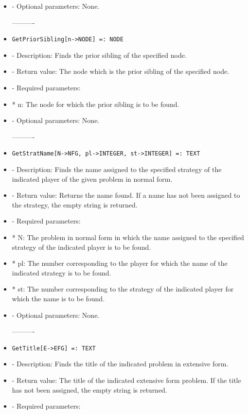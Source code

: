 \begin{itemize}
\item
- Optional parameters:  None.
\ed

----------
\item
\begin{verbatim}
GetPriorSibling[n->NODE] =: NODE
\end{verbatim}

\bd
\item
- Description:  Finds the prior sibling of the specified node.
\item
- Return value:  The node which is the prior sibling of the specified node.
\item
- Required parameters:

\bd
\item
*  n:  The node for which the prior sibling is to be found.
\ed

\item
- Optional parameters:  None.
\ed

----------
\item
\begin{verbatim}
GetStratName[N->NFG, pl->INTEGER, st->INTEGER] =: TEXT
\end{verbatim}

\bd
\item
- Description:  Finds the name assigned to the specified strategy of
the indicated player of the given problem in normal form.
\item
- Return value:  Returns the name found.  If a name has not been assigned
to the strategy, the empty string is returned.
\item
- Required parameters:

\bd
\item
*  N:  The problem in normal form in which the name assigned to the
specified strategy of the indicated player is to be found.
\item
*  pl:  The number corresponding to the player for which the name of
the indicated strategy is to be found.
\item
*  st:  The number corresponding to the strategy of the indicated 
player for which the name is to be found.
\ed

\item
- Optional parameters:  None.
\ed

----------
\item
\begin{verbatim}
GetTitle[E->EFG] =: TEXT
\end{verbatim}

\bd
\item
- Description:  Finds the title of the indicated problem in extensive form.
\item
- Return value:  The title of the indicated extensive form problem.  If
the title has not been assigned, the empty string is returned.
\item
- Required parameters:


\end{itemize}
